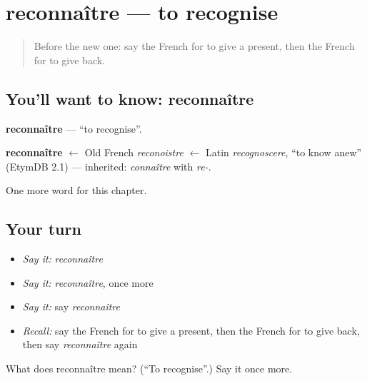 \section[reconnaître]{reconnaître — to recognise}

\label{lesson:FR-C210-reconnaitre}



\begin{quote}
Before the new one: say the French for to give a present, then the French for to give back.
\end{quote}

\subsection*{You'll want to know: reconnaître}
\textbf{reconnaître} — \textquotedblleft{}to recognise\textquotedblright{}.

\begin{cousinweb}
\textbf{reconnaître} $\leftarrow$ Old French \emph{reconoistre} $\leftarrow$ Latin \emph{recognoscere}, \textquotedblleft{}to know anew\textquotedblright{} (EtymDB 2.1) — inherited: \emph{connaître} with \emph{re-}.
\end{cousinweb}

\begin{grammarlens}[title={What you've built}]
One more word for this chapter.
\end{grammarlens}

\subsection*{Your turn}
\begin{itemize}
\raggedright
  \item \emph{Say it:} \emph{reconnaître}
  \item \emph{Say it:} \emph{reconnaître}, once more
  \item \emph{Say it:} say \emph{reconnaître}
  \item \emph{Recall:} say the French for to give a present, then the French for to give back, then say \emph{reconnaître} again
\end{itemize}

\begin{tcolorbox}[breakable,colback=teal!4,colframe=teal!35!black,title={Before you move on}]
What does reconnaître mean? (\textquotedblleft{}To recognise\textquotedblright{}.) Say it once more.
\end{tcolorbox}
